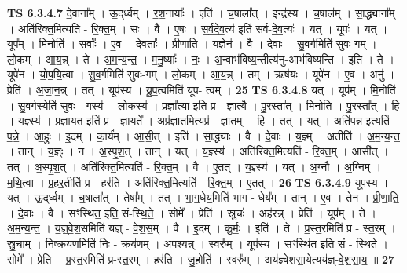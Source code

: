 \documentclass[17pt]{extarticle}
\begin{document}
                  \newline
                                \textbf{ TS 6.3.4.7} \newline
                  दे॒वाना᳚म् । ऊ॒द्‌र्ध्वम् । र॒श॒नायाः᳚ । एति॑ । च॒षाला᳚त् । इन्द्र॑स्य । च॒षाल᳚म् । सा॒द्ध्याना᳚म् । अति॑रिक्त॒मित्यति॑ - रि॒क्त॒म् । सः । वै । ए॒षः । स॒र्व॒दे॒व॒त्य॑ इति॑ सर्व-दे॒व॒त्यः॑ । यत् । यूपः॑ । यत् । यूप᳚म् । मि॒नोति॑ । सर्वाः᳚ । ए॒व । दे॒वताः᳚ । प्री॒णा॒ति॒ । य॒ज्ञेन॑ । वै । दे॒वाः । सु॒व॒र्गमिति॑ सुवः-गम् । लो॒कम् । आ॒य॒न्न् । ते । अ॒म॒न्य॒न्त॒ । म॒नु॒ष्याः᳚ । नः॒ । अ॒न्वाभ॑विष्य॒न्तीत्य॑नु-आभ॑विष्यन्ति । इति॑ । ते । यूपे॑न । यो॒प॒यि॒त्वा । सु॒व॒र्गमिति॑ सुवः-गम् । लो॒कम् । आ॒य॒न्न् । तम् । ऋष॑यः । यूपे॑न । ए॒व । अनु॑ । प्रेति॑ । अ॒जा॒न॒न्न् । तत् । यूप॑स्य । यू॒प॒त्वमिति॑ यूप- त्वम् । \textbf{  25} \newline
                  \newline
                                \textbf{ TS 6.3.4.8} \newline
                  यत् । यूप᳚म् । मि॒नोति॑ । सु॒व॒र्गस्येति॑ सुवः - गस्य॑ । लो॒कस्य॑ । प्रज्ञा᳚त्या॒ इति॒ प्र - ज्ञा॒त्यै॒ । पु॒रस्ता᳚त् । मि॒नो॒ति॒ । पु॒रस्ता᳚त् । हि । य॒ज्ञ्स्य॑ । प्र॒ज्ञा॒यत॒ इति॑ प्र - ज्ञा॒यते᳚ । अप्र॑ज्ञात॒मित्यप्र॑ - ज्ञा॒त॒म् । हि । तत् । यत् । अति॑पन्न॒ इत्यति॑ - प॒न्ने॒ । आ॒हुः । इ॒दम् । का॒र्य᳚म् । आ॒सी॒त् । इति॑ । सा॒द्ध्याः । वै । दे॒वाः । य॒ज्ञ्म् । अतीति॑ । अ॒म॒न्य॒न्त॒ । तान् । य॒ज्ञ्ः । न । अ॒स्पृ॒श॒त् । तान् । यत् । य॒ज्ञ्स्य॑ । अति॑रिक्त॒मित्यति॑ - रि॒क्त॒म् । आसी᳚त् । तत् । अ॒स्पृ॒श॒त् । अति॑रिक्त॒मित्यति॑ - रि॒क्त॒म् । वै । ए॒तत् । य॒ज्ञ्स्य॑ । यत् । अ॒ग्नौ । अ॒ग्निम् । म॒थि॒त्वा । प्र॒हर॒तीति॑ प्र - हर॑ति । अति॑रिक्त॒मित्यति॑ - रि॒क्त॒म् । ए॒तत् । \textbf{  26} \newline
                  \newline
                                \textbf{ TS 6.3.4.9} \newline
                  यूप॑स्य । यत् । ऊ॒द्‌र्ध्वम् । च॒षाला᳚त् । तेषा᳚म् । तत् । भा॒ग॒धेय॒मिति॑ भाग - धेय᳚म् । तान् । ए॒व । तेन॑ । प्री॒णा॒ति॒ । दे॒वाः । वै । सꣳस्थि॑त॒ इति॒ सं-स्थि॒ते॒ । सोमे᳚ । प्रेति॑ । स्रुचः॑ । अह॑रन्न् । प्रेति॑ । यूप᳚म् । ते । अ॒म॒न्य॒न्त॒ । य॒ज्ञ्॒वे॒श॒समिति॑ यज्ञ् - वे॒श॒स॒म् । वै । इ॒दम् । कु॒र्मः॒ । इति॑ । ते । प्र॒स्त॒रमिति॑ प्र - स्त॒रम् । स्रु॒चाम् । नि॒ष्क्रय॑ण॒मिति॑ निः - क्रय॑णम् । अ॒प॒श्य॒न्न् । स्वरु᳚म् । यूप॑स्य । सꣳस्थि॑त॒ इति॒ सं - स्थि॒ते॒ । सोमे᳚ । प्रेति॑ । प्र॒स्त॒रमिति॑ प्र-स्त॒रम् । हर॑ति । जु॒होति॑ । स्वरु᳚म् । अय॑ज्ञ्वेशसा॒येत्यय॑ज्ञ्-वे॒श॒सा॒य॒ ॥ \textbf{  27} \newline
\end{document}

